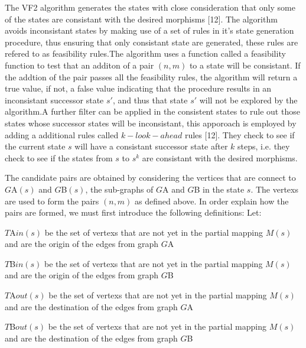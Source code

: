 The VF2 algorithm generates the states with close consideration that only some of the states are consistant with the desired morphisms [12]. The algorithm avoids inconsistant states by making use of a set of rules in it's state generation procedure, thus ensuring that only consistant state are generated, these rules are refered to as feasibility rules.\newline\newline The algorithm uses a function called a feasibility function to test that an additon of a pair $(n,m)$ to a state will be consistant. If the addtion of the pair passes all the feasibility rules, the algorithm will return a true value, if not, a false value indicating that the procedure results in an inconsistant successor  state $s'$, and thus that state $s'$ will not be explored by the algorithm.\newline\newline A further filter can be applied in the consistent states to rule out those states whose successor states will be inconsistant, this apporoach is employed by adding a additional rules called $k-look-ahead$ rules [12]. They check to see if the current state $s$ will have a consistant successor state after $k$ steps, i.e. they check to see if the states from $s$ to $s^k$ are consistant with the desired morphisms.

 The candidate pairs are obtained by considering the vertices that are connect to $G${\tiny A}$(s)$ and $G${\tiny B}$(s)$, the sub-graphs of $G${\tiny A} and $G${\tiny B} in the state $s$. The vertexs are used to form the pairs $(n,m)$ as defined above. In order explain how the pairs are formed, we must first introduce the following definitions:\newline
Let:
\begin{myEnumerate}
\item $T${\tiny A}$in(s)$ be the set of vertexs that are not yet in the partial mapping $M(s)$ and are the origin \quad of the edges from graph $G${\tiny A}
\item $T${\tiny B}$in(s)$ be the set of vertexs that are not yet in the partial mapping $M(s)$ and are the origin of the edges from graph $G${\tiny B}
\item $T${\tiny A}$out(s)$ be the set of vertexs that are not yet in the partial mapping $M(s)$ and are the destination of the edges from graph $G${\tiny A}
\item $T${\tiny B}$out(s)$ be the set of vertexs that are not yet in the partial mapping $M(s)$ and are the destination of the edges from graph $G${\tiny B}
\end{myEnumerate}

